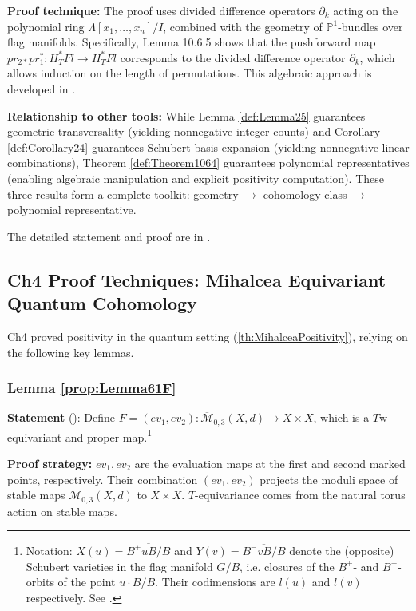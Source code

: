 \textbf{Proof technique:} The proof uses divided difference operators $\partial_k$ acting on the polynomial ring $\Lambda[x_1,\ldots,x_n]/I$, combined with the geometry of $\mathbb{P}^1$-bundles over flag manifolds. Specifically, Lemma 10.6.5 shows that the pushforward map $pr_{2*}pr_1^*: H_T^* Fl \to H_T^* Fl$ corresponds to the divided difference operator $\partial_k$, which allows induction on the length of permutations. This algebraic approach is developed in \cite[Chapter 10]{AndersonFulton}.

\textbf{Relationship to other tools:} While Lemma \ref{def:Lemma25} guarantees geometric transversality (yielding nonnegative integer counts) and Corollary \ref{def:Corollary24} guarantees Schubert basis expansion (yielding nonnegative linear combinations), Theorem \ref{def:Theorem1064} guarantees polynomial representatives (enabling algebraic manipulation and explicit positivity computation). These three results form a complete toolkit: geometry $\to$ cohomology class $\to$ polynomial representative.

The detailed statement and proof are in \cite[Section 10.6, Theorem 10.6.4]{AndersonFulton}.

\subsection{Ch4 Proof Techniques: Mihalcea Equivariant Quantum Cohomology}

\label{sec:Ch4ProofTechniques}

Ch4 proved positivity in the quantum setting (\cref{th:MihalceaPositivity}), relying on the following key lemmas.

\subsubsection{Lemma \cref{prop:Lemma61F}}
\label{sec:Lemma61FDetail}

\textbf{Statement} (\cite[ Lemma 6.1]{Mihalcea}): Define $F = (ev_1, ev_2) : \overline{\mathcal{M}}_{0,3}(X, d) \to X \times X$, which is a $T$w-equivariant and proper map.\footnote{Notation: $X(u) = \overline{B^+uB/B}$ and $Y(v) = \overline{B^-vB/B}$ denote the (opposite) Schubert varieties in the flag manifold $G/B$, i.e. closures of the $B^+$- and $B^-$-orbits of the point $u \cdot B/B$. Their codimensions are $l(u)$ and $l(v)$ respectively. See \cite[Section 10.1]{FultonQuntum1997}.} 

\textbf{Proof strategy:} $ev_1, ev_2$ are the evaluation maps at the first and second marked points, respectively. Their combination $(ev_1, ev_2)$ projects the moduli space of stable maps $\overline{\mathcal{M}}_{0,3}(X,d)$ to $X \times X$. $T$-equivariance comes from the natural torus action on stable maps.\ 

